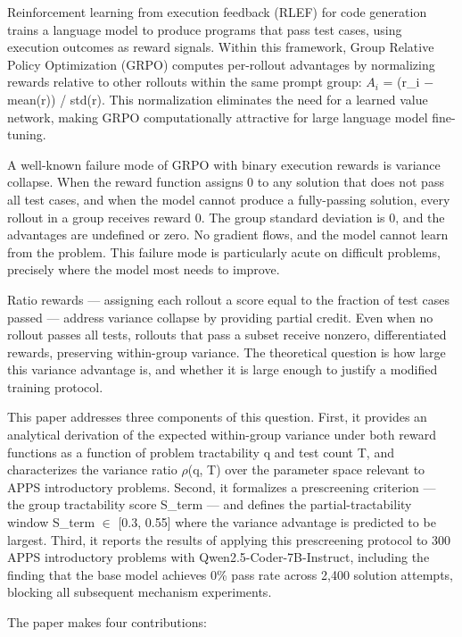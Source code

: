 
Reinforcement learning from execution feedback (RLEF) for code generation trains a language model to produce programs that pass test cases, using execution outcomes as reward signals. Within this framework, Group Relative Policy Optimization (GRPO) \citep{Shao2024} computes per-rollout advantages by normalizing rewards relative to other rollouts within the same prompt group: $A_i$ = (r\_i $-$ mean(r)) / std(r). This normalization eliminates the need for a learned value network, making GRPO computationally attractive for large language model fine-tuning.

A well-known failure mode of GRPO with binary execution rewards is variance collapse. When the reward function assigns 0 to any solution that does not pass all test cases, and when the model cannot produce a fully-passing solution, every rollout in a group receives reward 0. The group standard deviation is 0, and the advantages are undefined or zero. No gradient flows, and the model cannot learn from the problem. This failure mode is particularly acute on difficult problems, precisely where the model most needs to improve.

Ratio rewards --- assigning each rollout a score equal to the fraction of test cases passed --- address variance collapse by providing partial credit. Even when no rollout passes all tests, rollouts that pass a subset receive nonzero, differentiated rewards, preserving within-group variance. The theoretical question is how large this variance advantage is, and whether it is large enough to justify a modified training protocol.

This paper addresses three components of this question. First, it provides an analytical derivation of the expected within-group variance under both reward functions as a function of problem tractability q and test count T, and characterizes the variance ratio $\rho$(q, T) over the parameter space relevant to APPS introductory problems. Second, it formalizes a prescreening criterion --- the group tractability score S\_term --- and defines the partial-tractability window S\_term $\in$ [0.3, 0.55] where the variance advantage is predicted to be largest. Third, it reports the results of applying this prescreening protocol to 300 APPS introductory problems with Qwen2.5-Coder-7B-Instruct, including the finding that the base model achieves 0\% pass rate across 2,400 solution attempts, blocking all subsequent mechanism experiments.

The paper makes four contributions:

